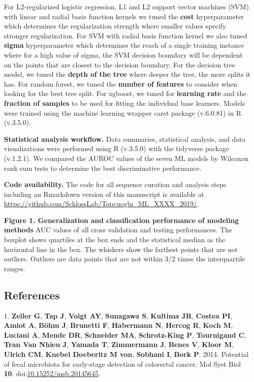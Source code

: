 \documentclass[11pt,]{article}
\begin{document}
For L2-regularized logistic regression, L1 and L2 support vector
machines (SVM) with linear and radial basis function kernels we tuned
the \textbf{cost} hyperparameter which determines the regularization
strength where smaller values specify stronger regularization. For SVM
with radial basis function kernel we also tuned \textbf{sigma}
hyperparameter which determines the reach of a single training instance
where for a high value of sigma, the SVM decision boundary will be
dependent on the points that are closest to the decision boundary. For
the decision tree model, we tuned the \textbf{depth of the tree} where
deeper the tree, the more splits it has. For random forest, we tuned the
\textbf{number of features} to consider when looking for the best tree
split. For xgboost, we tuned for \textbf{learning rate} and the
\textbf{fraction of samples} to be used for fitting the individual base
learners. Models were trained using the machine learning wrapper caret
package (v.6.0.81) in R (v.3.5.0).

\textbf{Statistical analysis workflow.} Data summaries, statistical
analysis, and data visualizations were performed using R (v.3.5.0) with
the tidyverse package (v.1.2.1). We compared the AUROC values of the
seven ML models by Wilcoxon rank sum tests to determine the best
discriminative performance.

\textbf{Code availability.} The code for all sequence curation and
analysis steps including an Rmarkdown version of this manuscript is
available at
\url{https://github.com/SchlossLab/Topcuoglu_ML_XXXX_2019/}.

\newpage

\textbf{Figure 1. Generalization and classification performance of
modeling methods } AUC values of all cross validation and testing
performances. The boxplot shows quartiles at the box ends and the
statistical median as the horizontal line in the box. The whiskers show
the farthest points that are not outliers. Outliers are data points that
are not within 3/2 times the interquartile ranges.

\newpage

\subsection{References}\label{references}

\hypertarget{refs}{}
\hypertarget{ref-zeller_potential_2014}{}
1. \textbf{Zeller G}, \textbf{Tap J}, \textbf{Voigt AY},
\textbf{Sunagawa S}, \textbf{Kultima JR}, \textbf{Costea PI},
\textbf{Amiot A}, \textbf{Böhm J}, \textbf{Brunetti F},
\textbf{Habermann N}, \textbf{Hercog R}, \textbf{Koch M},
\textbf{Luciani A}, \textbf{Mende DR}, \textbf{Schneider MA},
\textbf{Schrotz-King P}, \textbf{Tournigand C}, \textbf{Tran Van Nhieu
J}, \textbf{Yamada T}, \textbf{Zimmermann J}, \textbf{Benes V},
\textbf{Kloor M}, \textbf{Ulrich CM}, \textbf{Knebel Doeberitz M von},
\textbf{Sobhani I}, \textbf{Bork P}. 2014. Potential of fecal microbiota
for early-stage detection of colorectal cancer. Mol Syst Biol
\textbf{10}.
doi:\href{https://doi.org/10.15252/msb.20145645}{10.15252/msb.20145645}.
\end{document}
